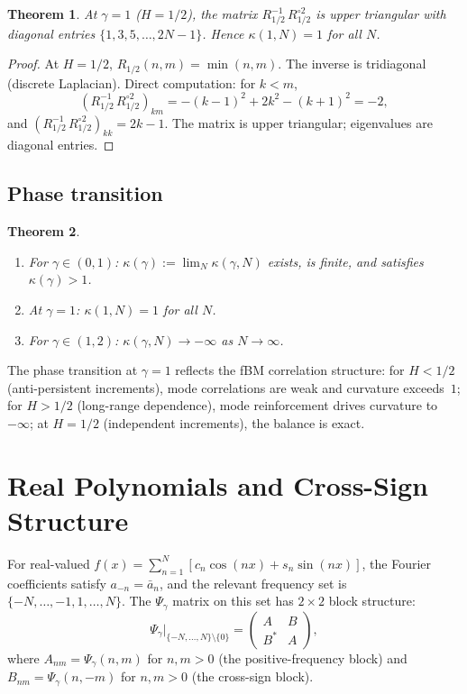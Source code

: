 \documentclass[11pt,a4paper]{article}
\theoremstyle{plain}
\newtheorem{theorem}{Theorem}[section]
\theoremstyle{definition}
\theoremstyle{remark}
\begin{document}
\begin{theorem}\label{thm:cauchy}
At $\gamma = 1$ ($H = 1/2$), the matrix $R_{1/2}^{-1}\,R_{1/2}^{\circ 2}$
is upper triangular with diagonal entries $\{1, 3, 5, \ldots, 2N-1\}$.
Hence $\kappa(1,N) = 1$ for all $N$.
\end{theorem}

\begin{proof}
At $H=1/2$, $R_{1/2}(n,m) = \min(n,m)$. The inverse is tridiagonal
(discrete Laplacian). Direct computation: for $k < m$,
\[
  (R_{1/2}^{-1}\,R_{1/2}^{\circ 2})_{km}
  = -(k-1)^2 + 2k^2 - (k+1)^2 = -2,
\]
and $(R_{1/2}^{-1}\,R_{1/2}^{\circ 2})_{kk} = 2k-1$.
The matrix is upper triangular; eigenvalues are diagonal entries.
\end{proof}


\subsection{Phase transition}

\begin{theorem}\label{thm:phase-transition}
\begin{enumerate}[label=(\roman*)]
\item For $\gamma \in (0,1)$: $\kappa(\gamma) := \lim_N \kappa(\gamma,N)$
  exists, is finite, and satisfies $\kappa(\gamma) > 1$.
\item At $\gamma = 1$: $\kappa(1,N) = 1$ for all $N$.
\item For $\gamma \in (1,2)$: $\kappa(\gamma,N) \to -\infty$ as
  $N \to \infty$.
\end{enumerate}
\end{theorem}

The phase transition at $\gamma = 1$ reflects the fBM correlation
structure: for $H < 1/2$ (anti-persistent increments), mode
correlations are weak and curvature exceeds~$1$; for $H > 1/2$
(long-range dependence), mode reinforcement drives curvature
to $-\infty$; at $H = 1/2$ (independent increments), the balance
is exact.


\section{Real Polynomials and Cross-Sign Structure}\label{sec:real}

For real-valued $f(x) = \sum_{n=1}^N [c_n\cos(nx) + s_n\sin(nx)]$,
the Fourier coefficients satisfy $a_{-n} = \bar{a}_n$, and the relevant
frequency set is $\{-N,\ldots,-1,1,\ldots,N\}$. The $\Psi_\gamma$ matrix
on this set has $2 \times 2$ block structure:
\begin{equation}\label{eq:block}
  \Psi_\gamma\Big|_{\{-N,\ldots,N\} \setminus \{0\}}
  = \begin{pmatrix} A & B \\ B^* & A \end{pmatrix},
\end{equation}
where $A_{nm} = \Psi_\gamma(n,m)$ for $n,m > 0$ (the positive-frequency
block) and $B_{nm} = \Psi_\gamma(n,-m)$ for $n,m > 0$ (the cross-sign
block).
\end{document}
